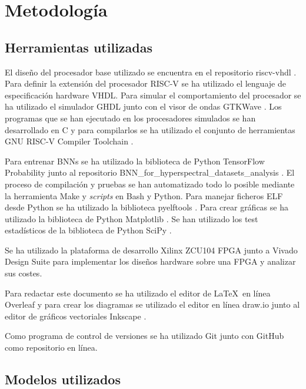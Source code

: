 \chapter{Metodología} \label{ch:metodologia}

\section{Herramientas utilizadas}

El diseño del procesador base utilizado se encuentra en el repositorio riscv-vhdl \cite{base_riscv_cpu_git}. Para definir la extensión del procesador RISC-V se ha utilizado el lenguaje de especificación hardware VHDL. Para simular el comportamiento del procesador se ha utilizado el simulador GHDL \cite{ghdl} junto con el visor de ondas GTKWave \cite{gtkwave}. Los programas que se han ejecutado en los procesadores simulados se han desarrollado en C y para compilarlos se ha utilizado el conjunto de herramientas GNU RISC-V Compiler Toolchain \cite{gcc_riscv}.

Para entrenar BNNs se ha utilizado la biblioteca de Python TensorFlow Probability \cite{tfprob} junto al repositorio BNN\_for\_hyperspectral\_datasets\_analysis \cite{bnn_hyper_git}. El proceso de compilación y pruebas se han automatizado todo lo posible mediante la herramienta Make y \textit{scripts} en Bash y Python. Para manejar ficheros ELF desde Python se ha utilizado la biblioteca pyelftools \cite{pyelftools}. Para crear gráficas se ha utilizado la biblioteca de Python Matplotlib \cite{matplotlib}. Se han utilizado los test estadísticos de la biblioteca de Python SciPy \cite{scipy}.

Se ha utilizado la plataforma de desarrollo Xilinx ZCU104 FPGA \cite{fpga_board} junto a Vivado Design Suite \cite{vivado} para implementar los diseños hardware sobre una FPGA y analizar sus costes.

Para redactar este documento se ha utilizado el editor de \LaTeX\ en línea Overleaf \cite{overleaf} y para crear los diagramas se utilizado el editor en línea draw.io \cite{drawio} junto al editor de gráficos vectoriales Inkscape \cite{inkscape}.

Como programa de control de versiones se ha utilizado Git \cite{git} junto con GitHub \cite{github} como repositorio en línea.

\section{Modelos utilizados}

